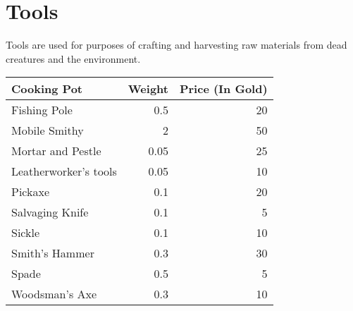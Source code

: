 \section{Tools}
Tools are used for purposes of crafting and harvesting raw materials from dead creatures and the environment.

\begin{longtable}{l | r | r}
	Cooking Pot & Weight & Price (In Gold)\\ \hline
	Fishing Pole & 0.5 & 20\\
	Mobile Smithy & 2 & 50\\
	Mortar and Pestle & 0.05 & 25\\
	Leatherworker's tools & 0.05 & 10\\
	Pickaxe & 0.1 & 20\\
	Salvaging Knife & 0.1 & 5\\
	Sickle & 0.1 & 10\\
	Smith's Hammer & 0.3 & 30\\
	Spade & 0.5 & 5\\
	Woodsman's Axe & 0.3 & 10\\
\end{longtable}